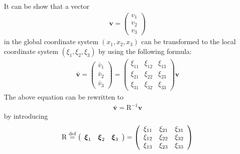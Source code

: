 \documentclass[a4paper,12pt,dvips]{article}
\newcommand*\defeq{\buildrel{\text{def}}\over{=}}
\begin{document}
It can be show that a vector
\begin{align*}
  \mathbf{v}
  = \left(\begin{array}{c}
    v_1 \\ v_2 \\ v_3
  \end{array}\right)
\end{align*}
in the global coordinate system $(x_1, x_2, x_3)$ can be transformed to the
local coordinate system $(\xi_1, \xi_2, \xi_3)$ by using the following formula:
\begin{align*}
  \bar{\mathbf{v}}
  = \left(\begin{array}{c}
    \bar{v}_1 \\ \bar{v}_2 \\ \bar{v}_3
  \end{array}\right)
  = \left(\begin{array}{ccc}
    \xi_{11} & \xi_{12} & \xi_{13} \\
    \xi_{21} & \xi_{22} & \xi_{23} \\
    \xi_{31} & \xi_{32} & \xi_{33}
  \end{array}\right)
  \mathbf{v}
\end{align*}
The above equation can be rewritten to
\begin{align*}
  \bar{\mathbf{v}} = \mathrm{R}^{-1}\mathbf{v}
\end{align*}
by introducing
\begin{align*}
  \mathrm{R} \defeq \left(\begin{array}{ccc}
    \boldsymbol{\xi}_1 &
    \boldsymbol{\xi}_2 &
    \boldsymbol{\xi}_3
  \end{array}\right)
  = \left(\begin{array}{ccc}
    \xi_{11} & \xi_{21} & \xi_{31} \\
    \xi_{12} & \xi_{22} & \xi_{32} \\
    \xi_{13} & \xi_{23} & \xi_{33}
  \end{array}\right)
\end{align*}
\end{document}
